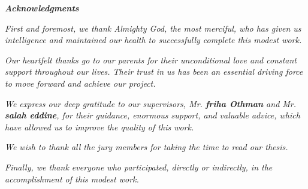 \begin{center}
    {\Large \textbf{\textit{Acknowledgments}}}
\end{center}

\vspace{1cm}

\begin{center}
    \textit{First and foremost, we thank Almighty God, the most merciful, who has given us intelligence and maintained our health to successfully complete this modest work.}
\end{center}

\begin{center}
    \textit{Our heartfelt thanks go to our parents for their unconditional love and constant support throughout our lives. Their trust in us has been an essential driving force to move forward and achieve our project.}
\end{center}

\begin{center}
    \textit{We express our deep gratitude to our supervisors, Mr. \textbf{\textit{friha Othman}} and Mr. \textbf{\textit{salah eddine}}, for their guidance, enormous support, and valuable advice, which have allowed us to improve the quality of this work.}
\end{center}

\begin{center}
    \textit{We wish to thank all the jury members for taking the time to read our thesis.}
\end{center}

\begin{center}
    \textit{Finally, we thank everyone who participated, directly or indirectly, in the accomplishment of this modest work.}
\end{center}